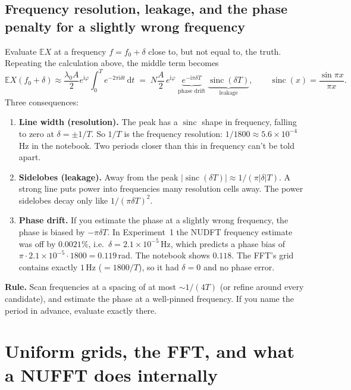 \documentclass[11pt,a4paper]{article}
\newcommand{\E}{\mathbb{E}}
\newcommand{\sinc}{\operatorname{sinc}}
\newcommand{\ii}{\mathrm{i}}
\newcommand{\dd}{\,\mathrm{d}}
\begin{document}
\subsection{Frequency resolution, leakage, and the phase penalty for a slightly wrong frequency}\label{sec:leak}
Evaluate $\E X$ at a frequency $f=f_0+\delta$ close to, but not equal to, the truth. Repeating the calculation above,
the middle term becomes
\begin{equation}\label{eq:dirichlet}
  \E X(f_0+\delta)\approx \frac{\lambda_0A}{2}e^{\ii\varphi}\int_0^T e^{-2\pi\ii\delta t}\dd t
  \;=\; N\frac A2\, e^{\ii\varphi}\; \underbrace{e^{-\ii\pi\delta T}}_{\text{phase drift}}\;\underbrace{\sinc(\delta T)}_{\text{leakage}},
  \qquad \sinc(x)=\frac{\sin \pi x}{\pi x}.
\end{equation}
Three consequences:
\begin{enumerate}
  \item \textbf{Line width (resolution).} The peak has a $\sinc$ shape in frequency, falling to zero at $\delta=\pm1/T$.
        So $1/T$ is the frequency resolution: $1/1800\approx5.6\times10^{-4}$\,Hz in the notebook. Two periods closer
        than this in frequency can't be told apart.
  \item \textbf{Sidelobes (leakage).} Away from the peak $|\sinc(\delta T)|\approx 1/(\pi|\delta| T)$. A strong line puts power into frequencies
        many resolution cells away. The power sidelobes decay only like $1/(\pi\delta T)^2$.
  \item \textbf{Phase drift.} If you estimate the phase at a slightly wrong frequency, the phase is biased by
        $-\pi\delta T$. In Experiment~1 the NUDFT frequency estimate was off by $0.0021\%$, i.e.\ $\delta=2.1\times10^{-5}$\,Hz, which predicts a
        phase bias of $\pi\cdot2.1\times10^{-5}\cdot1800 = 0.119$\,rad. The notebook shows $0.118$. The FFT's grid contains
        exactly $1$\,Hz ($=1800/T$), so it had $\delta=0$ and no phase error.
\end{enumerate}

\begin{note}
\textbf{Rule.} Scan frequencies at a spacing of at most $\sim\!1/(4T)$ (or refine around every candidate), and estimate
the phase at a well-pinned frequency. If you name the period in advance, evaluate exactly there.
\end{note}

\section{Uniform grids, the FFT, and what a NUFFT does internally}\label{sec:grid}
\end{document}

